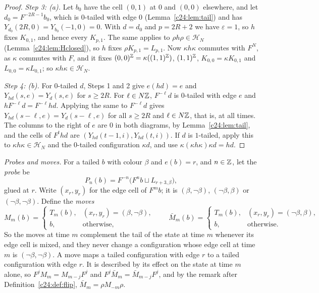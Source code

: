 \begin{proof}
\emph{Step 3: (a).} Let $b_0$ have the cell $(0,1)$ at $0$ and $(0,0)$ elsewhere, and let $d_0=F^{-2R-1}b_0$, which is $0$-tailed with edge $0$ (Lemma~\ref{c24:lem:tail}) and has $Y_{d_0}(2R,0)=Y_{b_0}(-1,0)=0$. With $d=d_0$ and $p=2R+2$ we have $\varepsilon=1$, so $h$ fixes $K_{0,1}$, and hence every $K_{p,1}$. The same applies to $\rho h\rho\in\mathcal H_N$ (Lemma~\ref{c24:lem:Hclosed}), so $h$ fixes $\rho K_{p,1}=L_{p,1}$. Now $\kappa h\kappa$ commutes with $F^N$, as $\kappa$ commutes with $F$, and it fixes $(0,0)^{\mathbb{Z}}=\kappa((1,1)^{\mathbb{Z}})$, $(1,1)^{\mathbb{Z}}$, $K_{0,0}=\kappa K_{0,1}$ and $L_{0,0}=\kappa L_{0,1}$; so $\kappa h\kappa\in\mathcal H_N$.

\emph{Step 4: (b).} For $0$-tailed $d$, Steps 1 and 2 give $e(hd)=e$ and $Y_{hd}(s,e)=Y_d(s,e)$ for $s\ge 2R$. For $\ell\in N\mathbb{Z}$, $F^{-\ell}d$ is $0$-tailed with edge $e$ and $hF^{-\ell}d=F^{-\ell}hd$. Applying the same to $F^{-\ell}d$ gives $Y_{hd}(s-\ell,e)=Y_d(s-\ell,e)$ for all $s\ge2R$ and $\ell\in N\mathbb{Z}$, that is, at all times. The columns to the right of $e$ are $0$ in both diagrams, by Lemma~\ref{c24:lem:tail}, and the cells of $F^thd$ are $(Y_{hd}(t-1,i),Y_{hd}(t,i))$. If $d$ is $1$-tailed, apply this to $\kappa h\kappa\in\mathcal H_N$ and the $0$-tailed configuration $\kappa d$, and use $\kappa(\kappa h\kappa)\kappa d=hd$.
\end{proof}

\emph{Probes and moves.} For a tailed $b$ with colour $\beta$ and $e(b)=r$, and $n\in\mathbb{Z}$, let the \emph{probe} be
\[
P_n(b)=F^{-n}\bigl(F^nb\sqcup L_{r+3,\beta}\bigr),
\]
glued at $r$. Write $(x_r,y_r)$ for the edge cell of $F^mb$; it is $(\beta,\neg\beta)$, $(\neg\beta,\beta)$ or $(\neg\beta,\neg\beta)$. Define the \emph{moves}
\[
M_m(b)=\begin{cases}T_m(b),&(x_r,y_r)=(\beta,\neg\beta),\\ b,&\text{otherwise},\end{cases}\qquad
\bar M_m(b)=\begin{cases}T_m(b),&(x_r,y_r)=(\neg\beta,\beta),\\ b,&\text{otherwise}.\end{cases}
\]
So the moves at time $m$ complement the tail of the state at time $m$ whenever its edge cell is mixed, and they never change a configuration whose edge cell at time $m$ is $(\neg\beta,\neg\beta)$. A move maps a tailed configuration with edge $r$ to a tailed configuration with edge $r$. It is described by its effect on the state at time $m$ alone, so $F^jM_m=M_{m-j}F^j$ and $F^j\bar M_m=\bar M_{m-j}F^j$, and by the remark after Definition~\ref{c24:def:flip}, $\bar M_m=\rho M_{-m}\rho$.

